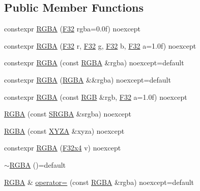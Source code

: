 \subsection*{Public Member Functions}
\begin{DoxyCompactItemize}
\item 
constexpr \mbox{\hyperlink{structmage_1_1_r_g_b_a_afe334e4408a71e808b8cf0bc9dd06dde}{R\+G\+BA}} (\mbox{\hyperlink{namespacemage_aa97e833b45f06d60a0a9c4fc22ae02c0}{F32}} rgba=0.\+0f) noexcept
\item 
constexpr \mbox{\hyperlink{structmage_1_1_r_g_b_a_a12ae339b8bcae0a1c0aacad280963ade}{R\+G\+BA}} (\mbox{\hyperlink{namespacemage_aa97e833b45f06d60a0a9c4fc22ae02c0}{F32}} r, \mbox{\hyperlink{namespacemage_aa97e833b45f06d60a0a9c4fc22ae02c0}{F32}} g, \mbox{\hyperlink{namespacemage_aa97e833b45f06d60a0a9c4fc22ae02c0}{F32}} b, \mbox{\hyperlink{namespacemage_aa97e833b45f06d60a0a9c4fc22ae02c0}{F32}} a=1.\+0f) noexcept
\item 
constexpr \mbox{\hyperlink{structmage_1_1_r_g_b_a_ad399faf871c1dec0ee3c4c0eb89329df}{R\+G\+BA}} (const \mbox{\hyperlink{structmage_1_1_r_g_b_a}{R\+G\+BA}} \&rgba) noexcept=default
\item 
constexpr \mbox{\hyperlink{structmage_1_1_r_g_b_a_a931063ef190241d875856430aa9fbac9}{R\+G\+BA}} (\mbox{\hyperlink{structmage_1_1_r_g_b_a}{R\+G\+BA}} \&\&rgba) noexcept=default
\item 
constexpr \mbox{\hyperlink{structmage_1_1_r_g_b_a_ad766984007f021cdde26f63436d90825}{R\+G\+BA}} (const \mbox{\hyperlink{structmage_1_1_r_g_b}{R\+GB}} \&rgb, \mbox{\hyperlink{namespacemage_aa97e833b45f06d60a0a9c4fc22ae02c0}{F32}} a=1.\+0f) noexcept
\item 
\mbox{\hyperlink{structmage_1_1_r_g_b_a_a82b256781126a25fd7a9a84a75fffb90}{R\+G\+BA}} (const \mbox{\hyperlink{structmage_1_1_s_r_g_b_a}{S\+R\+G\+BA}} \&srgba) noexcept
\item 
\mbox{\hyperlink{structmage_1_1_r_g_b_a_a008be57a6540fee8ed02d285681e3ed4}{R\+G\+BA}} (const \mbox{\hyperlink{structmage_1_1_x_y_z_a}{X\+Y\+ZA}} \&xyza) noexcept
\item 
constexpr \mbox{\hyperlink{structmage_1_1_r_g_b_a_a058e985bdbdf376616d1f6dd121d2dd8}{R\+G\+BA}} (\mbox{\hyperlink{namespacemage_a851648f37dfb126a2d2f973e102861ad}{F32x4}} v) noexcept
\item 
\mbox{\hyperlink{structmage_1_1_r_g_b_a_a139a22381a3fb02d1f28be505b41c9df}{$\sim$\+R\+G\+BA}} ()=default
\item 
\mbox{\hyperlink{structmage_1_1_r_g_b_a}{R\+G\+BA}} \& \mbox{\hyperlink{structmage_1_1_r_g_b_a_a96b9f7d1b17cc68b8b0949eefe3d3e5c}{operator=}} (const \mbox{\hyperlink{structmage_1_1_r_g_b_a}{R\+G\+BA}} \&rgba) noexcept=default

\end{DoxyCompactItemize}
